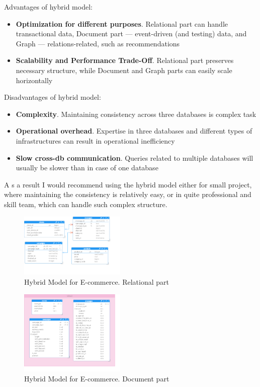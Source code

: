\documentclass[conference]{IEEEtran}
\begin{document}
Advantages of hybrid model:
\begin{itemize}
    \item \textbf{Optimization for different purposes}. Relational part can handle transactional data, Document part --- event-driven (and testing) data, and Graph --- relations-related, such as recommendations
    \item \textbf{Scalability and Performance Trade-Off}. Relational part preserves necessary structure, while Document and Graph parts can easily scale horizontally
\end{itemize}

Disadvantages of hybrid model:
\begin{itemize}
    \item \textbf{Complexity}. Maintaining consistency across three databases is complex task
    \item \textbf{Operational overhead}. Expertise in three databases and different types of infrastructures can result in operational inefficiency
    \item \textbf{Slow cross-db communication}. Queries related to multiple databases will usually be slower than in case of one database
\end{itemize}
A
s a result I would recommend using the hybrid model either for small project, where maintaining the consistency is relatively easy, or in quite professional and skill team, which can handle such complex structure.

\begin{figure}[htbp]
    \centerline{\includegraphics[width=0.45\textwidth]{../screenshots/PostgresModelOptimal.png}}
    \caption{Hybrid Model for E-commerce. Relational part}\label{fig:postgres_optimal}
\end{figure}

\begin{figure}[htbp]
    \centerline{\includegraphics[width=0.45\textwidth]{../screenshots/MongoDBModelOptimal.png}}
    \caption{Hybrid Model for E-commerce. Document part}\label{fig:mongo_optimal}
\end{figure}
\end{document}
